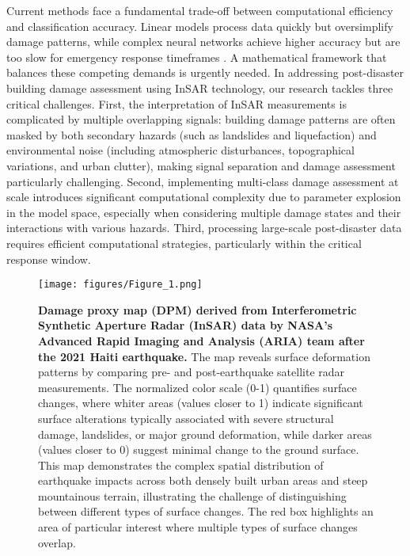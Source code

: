 \documentclass[review]{elsarticle}
\begin{document}
Current methods face a fundamental trade-off between computational efficiency and classification accuracy. Linear models process data quickly but oversimplify damage patterns, while complex neural networks achieve higher accuracy but are too slow for emergency response timeframes \cite{xu2022seismic}. A mathematical framework that balances these competing demands is urgently needed. In addressing post-disaster building damage assessment using InSAR technology, our research tackles three critical challenges. First, the interpretation of InSAR measurements is complicated by multiple overlapping signals: building damage patterns are often masked by both secondary hazards (such as landslides and liquefaction) and environmental noise (including atmospheric disturbances, topographical variations, and urban clutter), making signal separation and damage assessment particularly challenging. Second, implementing multi-class damage assessment at scale introduces significant computational complexity due to parameter explosion in the model space, especially when considering multiple damage states and their interactions with various hazards. Third, processing large-scale post-disaster data requires efficient computational strategies, particularly within the critical response window.

\begin{figure}
\centering
\texttt{[image: figures/Figure\_1.png]}
\caption{\textbf{Damage proxy map (DPM) derived from Interferometric Synthetic Aperture Radar (InSAR) data by NASA's Advanced Rapid Imaging and Analysis (ARIA) team \cite{ARIA} after the 2021 Haiti earthquake.} The map reveals surface deformation patterns by comparing pre- and post-earthquake satellite radar measurements. The normalized color scale (0-1) quantifies surface changes, where whiter areas (values closer to 1) indicate significant surface alterations typically associated with severe structural damage, landslides, or major ground deformation, while darker areas (values closer to 0) suggest minimal change to the ground surface. This map demonstrates the complex spatial distribution of earthquake impacts across both densely built urban areas and steep mountainous terrain, illustrating the challenge of distinguishing between different types of surface changes. The red box highlights an area of particular interest where multiple types of surface changes overlap.}
\label{DPM_example}
\end{figure}
\end{document}
